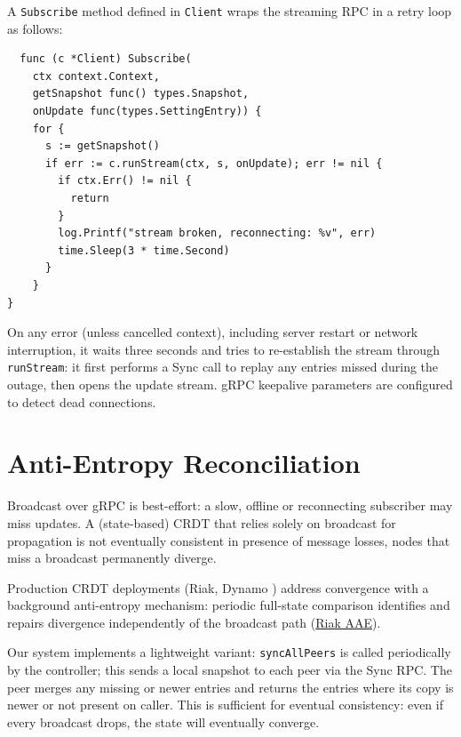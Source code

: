 \documentclass[conference]{IEEEtran}
\begin{document}
{\color{violet}A \texttt{Subscribe} method defined in \texttt{Client} wraps the streaming RPC in
  a retry loop as follows:

\begin{lstlisting}
  func (c *Client) Subscribe(
    ctx context.Context,
    getSnapshot func() types.Snapshot,
    onUpdate func(types.SettingEntry)) {
    for {
      s := getSnapshot()
      if err := c.runStream(ctx, s, onUpdate); err != nil {
        if ctx.Err() != nil {
          return
        }
        log.Printf("stream broken, reconnecting: %v", err)
        time.Sleep(3 * time.Second)
      }
    }
}
\end{lstlisting}

  On any error (unless cancelled context), including server restart or network
  interruption, it waits three seconds and tries to re-establish the stream through \texttt{runStream}:
  it first performs a Sync call to replay any entries missed during the outage, then opens the update stream.
gRPC keepalive parameters are configured to detect dead connections.}

\section{Anti-Entropy Reconciliation}
\label{sec:antientropy}

Broadcast over gRPC is best-effort: a slow, offline or reconnecting subscriber
may miss updates. A (state-based) CRDT that relies solely on broadcast for
propagation is not eventually consistent in presence of message losses,
nodes that miss a broadcast permanently diverge.

Production CRDT deployments (Riak, Dynamo \cite{dynamo2007}) address convergence
with a background anti-entropy mechanism: periodic full-state comparison
identifies and repairs divergence independently of the broadcast path (\href{https://docs.riak.com/riak/kv/latest/learn/concepts/active-anti-entropy/index.html}{Riak AAE}).

Our system implements a lightweight variant: \texttt{syncAllPeers}
is called periodically by the controller; this sends a local snapshot to
each peer via the Sync RPC. The peer merges any missing or newer entries and returns the entries where its copy is newer
or not present on caller.
This is sufficient for eventual consistency: even if every broadcast drops, {\color{violet}the
state will eventually converge.}
\end{document}
